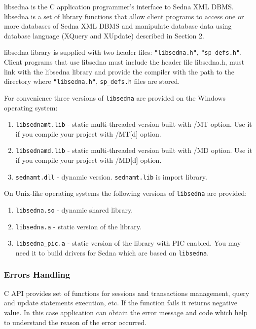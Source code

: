 \documentclass[a4paper,12pt]{article}
\begin{document}
libsedna is the C application programmer's interface to Sedna XML DBMS. libsedna
is a set of library functions that allow client programs to access one or more
databases of Sedna XML DBMS and manipulate database data using database language
(XQuery and XUpdate) described in Section 2.

libsedna library is supplied with two header files: \verb!"libsedna.h"!,
\verb!"sp_defs.h"!. Client programs that use libsedna must include the header
file libsedna.h, must link with the libsedna library and provide the compiler
with the path to the directory where \verb!"libsedna.h"!, \verb!sp_defs.h! files
are stored.

For convenience three versions of \verb!libsedna! are provided on the Windows
operating system:

\begin{enumerate}
\item\verb!libsednamt.lib! - static multi-threaded version built with /MT
option. Use it if you compile your project with /MT[d] option.
\item\verb!libsednamd.lib! - static multi-threaded version built with /MD
option. Use it if you compile your project with /MD[d] option.
\item\verb!sednamt.dll! - dynamic version. \verb!sednamt.lib! is import library.
\end{enumerate}

On Unix-like operating systems the following versions of \verb!libsedna! are
provided:

\begin{enumerate}
\item\verb!libsedna.so! - dynamic shared library.
\item\verb!libsedna.a! - static version of the library.
\item\verb!libsedna_pic.a! - static version of the library with PIC enabled. You
may need it to build drivers for Sedna which are based on \verb!libsedna!.
\end{enumerate}


\subsubsection{Errors Handling}

C API provides set of functions for sessions and transactions management, query
and update statements execution, etc. If the function fails it returns negative
value. In this case application can obtain the error message and code which help
to understand the reason of the error occurred.
\end{document}
